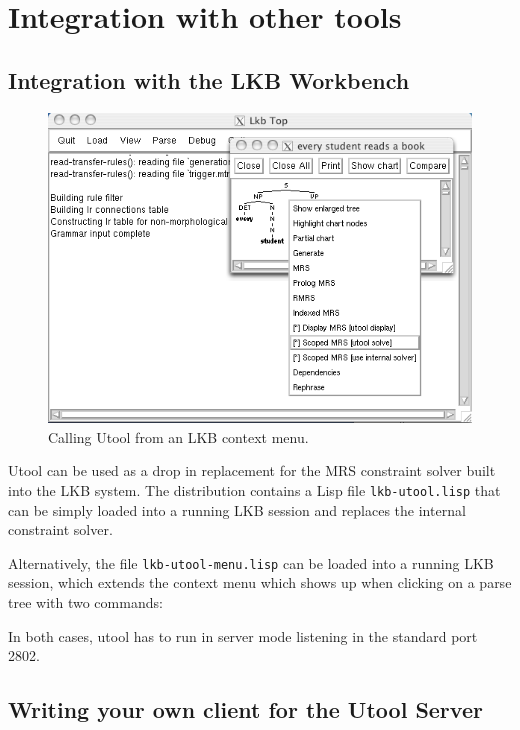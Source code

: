 \section{Integration with other tools}
\label{sec:integration}


\subsection{Integration with the LKB Workbench}
\label{sec:integration-lkb}

\begin{figure}
\includegraphics[width=\textwidth]{lkb-integration}
\caption{Calling Utool from an LKB context menu.
\label{fig:lkb-integration}}
\end{figure}

Utool can be used as a drop in replacement for the MRS constraint
solver built into the LKB system. The distribution contains a Lisp
file \verb|lkb-utool.lisp| that can be simply loaded into a running
LKB session and replaces the internal constraint solver.

Alternatively, the file \verb|lkb-utool-menu.lisp| can be loaded into
a running LKB session, which extends the context menu which shows up
when clicking on a parse tree with two commands:

In both cases, utool has to run in server mode listening in the
standard port 2802.

\subsection{Writing your own client for the Utool Server}

